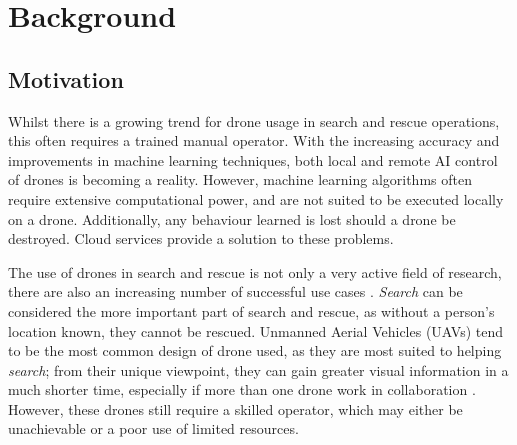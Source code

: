 \documentclass{article}
\begin{document}
\section{Background}
\subsection{Motivation}
Whilst there is a growing trend for drone usage in search and rescue operations, this often requires a trained manual operator. With the increasing accuracy and improvements in machine learning techniques, both local and remote AI control of drones is becoming a reality. However, machine learning algorithms often require extensive computational power, and are not suited to be executed locally on a drone. Additionally, any behaviour learned is lost should a drone be destroyed. Cloud services provide a solution to these problems.


The use of drones in search and rescue is not only a very active field of research, there are also an increasing number of successful use cases \cite{UAVUseCase}. \emph{Search} can be considered the more important part of search and rescue, as without a person's location known, they cannot be rescued. Unmanned Aerial Vehicles (UAVs) tend to be the most common design of drone used, as they are most suited to helping \emph{search}; from their unique viewpoint, they can gain greater visual information in a much shorter time, especially if more than one drone work in collaboration \cite{UAV}. However, these drones still require a skilled operator, which may either be unachievable or a poor use of limited resources.
\end{document}
